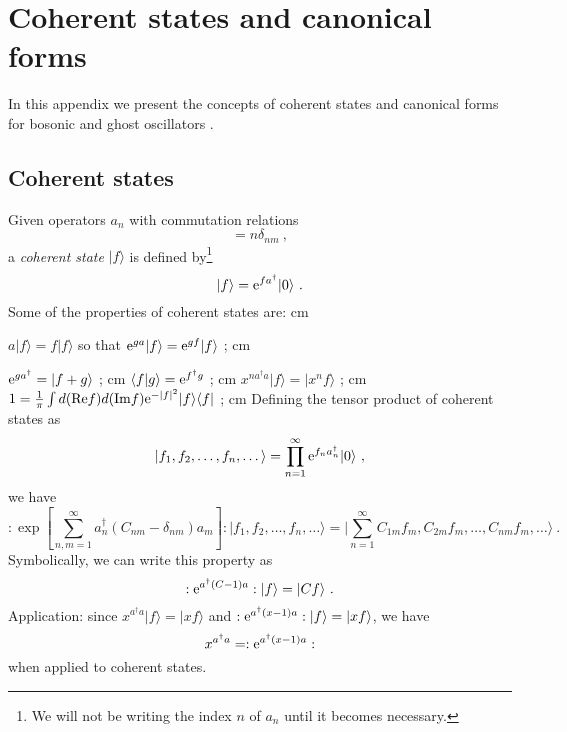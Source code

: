 \documentclass[a4paper,11pt]{article}
\begin{document}
\appendix

\section{Coherent states and canonical forms}

In this appendix we present the concepts of coherent states and canonical forms for bosonic and ghost oscillators \cite{cg1} \cite{cg2}.

\subsection{Coherent states}

Given operators $a_n$ with commutation relations
\begin{equation}
[a_n,a_m^\dagger ]=n\delta_{nm}\ ,
\end{equation}
a {\sl coherent state} $|f\rangle $ is defined by\footnote{We will not be writing the index $n$ of $a_n$ until it becomes necessary.}
\begin{equation}
|f\rangle ={\rm e}^{fa^\dagger }|0\rangle \ .
\end{equation}
Some of the properties of coherent states are:
 cm

 $a|f\rangle =f|f\rangle $ so that ${\rm e}^{ga}|f\rangle ={\rm e}^{gf}|f\rangle $ ;
 cm

 ${\rm e}^{ga^\dagger }=|f+g\rangle $ ;
 cm
 $\langle f|g\rangle ={\rm e}^{f^\dagger g}$ ;
 cm
 $x^{na^\dagger a}|f\rangle =|x^nf\rangle $ ;
 cm
 $1=\frac{1}{\pi }\int d({\rm Re }f)d({\rm Im}f){\rm e}^{-|f|^2}|f\rangle \langle f|$ ;
 cm
 Defining the tensor product of coherent states as
\begin{equation}
|f_1,f_2,\dots ,f_n,\dots \rangle =\prod_{n=1}^\infty {\rm e}^{f_na_n^\dagger }|0\rangle \ ,
\end{equation}
we have
\begin{equation}
:\exp \left[ \sum_{n,m=1}^\infty a_n^\dagger (C_{nm}-\delta _{nm})a_m\right] :|f_1,f_2,\dots ,f_n,\dots \rangle = |\sum_{n=1}^\infty C_{1m}f_m,C_{2m}f_m,\dots ,C_{nm}f_m,\dots \rangle \ .
\end{equation}
Symbolically, we can write this property as
\begin{equation}
:{\rm e}^{a^\dagger (C-1)a}:|f\rangle =|Cf\rangle \ .
\end{equation}
Application: since $x^{a^\dagger a}|f\rangle =|xf\rangle $ and $:{\rm e}^{a^\dagger (x-1)a}:|f\rangle =|xf\rangle $, we have
\begin{equation}
x^{a^\dagger a}=:{\rm e}^{a^\dagger (x-1)a}:
\end{equation}
when applied to coherent states.
\end{document}
